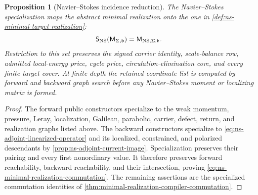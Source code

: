 \documentclass[11pt]{article}
\numberwithin{section}{part}
\theoremstyle{plain}
\newtheorem{proposition}[proposition]{Proposition}
\theoremstyle{definition}
\theoremstyle{remark}
\begin{document}
\begin{proposition}[Navier--Stokes incidence reduction]
\label{prop:ns-incidence-reduction}
The Navier--Stokes specialization maps the abstract minimal realization onto
the one in \cref{def:ns-minimal-target-realization}:
\begin{equation}
 \label{eq:ns-minimal-realization-commutation}
 \mathsf S_{\rm NS}(\mathsf M_{\Sigma,\mathfrak b})
 =\mathsf M_{{\rm NS},\Sigma,\mathfrak b}.
\end{equation}
Restriction to this set preserves the signed carrier identity, scale-balance
row, admitted local-energy price, cycle price, circulation-elimination core,
and every finite target cover.  At finite depth the retained coordinate list
is computed by forward and backward graph search before any Navier--Stokes
moment or localizing matrix is formed.
\end{proposition}

\begin{proof}
The forward public constructors specialize to the weak momentum, pressure,
Leray, localization, Galilean, parabolic, carrier, defect, return, and
realization graphs listed above.  The backward constructors specialize to
\eqref{eq:ns-adjoint-linearized-operator} and its localized, constrained, and
polarized descendants by \cref{prop:ns-adjoint-current-image}.  Specialization
preserves their pairing and every first nonordinary value.  It therefore
preserves forward reachability, backward reachability, and their
intersection, proving \eqref{eq:ns-minimal-realization-commutation}.  The
remaining assertions are the specialized commutation identities of
\cref{thm:minimal-realization-compiler-commutation}.
\end{proof}
\end{document}
